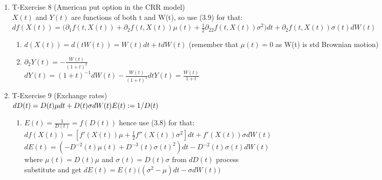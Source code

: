 \documentclass[11pt]{article}
\begin{document}
\begin{enumerate} %
\item T-Exercise 8 (American put option in the CRR model)
\\[5pt] $X(t)$ and $Y(t)$ are functions of both t and W(t), so use (3.9) for that: 
\\[5pt] $df(X(t))=\bigg(\partial_1 f(t, X(t)) +  \partial_2 f(t,X(t))\mu(t) + \frac{1}{2}\partial_{22}f(t,X(t))\sigma^2\bigg)dt+\partial_2f(t, X(t))\sigma(t) dW(t)$	

	\begin{enumerate} %
		\item $d(X(t))=d(tW(t))=W(t)dt+tdW(t)$ (remember that $\mu(t) = 0$ as W(t) is std Brownian motion)
	
		\item $\partial_2 Y(t)=-\frac{W(t)}{(1+t)^2}$
		\\[5pt] $dY(t)=(1+t)^{-1}dW(t)-\frac{W(t)}{(1+t)^2}dt$$Y(t)=\frac{W(t)}{1+t}$
	\end{enumerate}
	
\item T-Exercise 9 (Exchange rates)
\\[5pt] $dD(t)=D(t)\mu dt+D(t)\sigma dW(t) 
\\ E(t):=1/D(t)$
	\begin{enumerate} %
		\item $E(t)=\frac{1}{D(t)}=f(D(t))$ hence use (3.8) for that: 
		\\[5pt] $df(X(t))=[f'(X(t))\mu+\frac{1}{2}f''(X(t))\sigma^2]dt+f'(X(t))\sigma dW(t)$ 
		\\[5pt] $dE(t)=(-D^{-2}(t)\mu (t)+D^{-3}(t)\sigma(t)^2)dt-D^{-2}(t)\sigma(t) dW(t)$
		\\[5pt] where $\mu (t) = D(t)\mu$ and $\sigma(t) = D(t)\sigma$ from $dD(t)$ process
		\\[5pt] substitute and get $dE(t) = E(t)\bigg( (\sigma^2 - \mu)dt-\sigma dW(t) \bigg)$ 
		\\[5pt]
		

\end{enumerate}
\end{enumerate}
\end{document}
